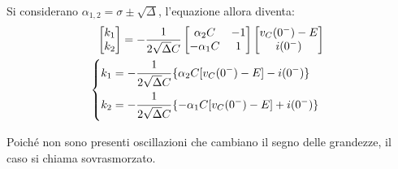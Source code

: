 \documentclass{article}
\numberwithin{equation}{subsection}
\begin{document}
Si considerano $\alpha_{1,2}=\sigma\pm\sqrt\Delta$, l'equazione allora diventa:
\begin{gather*}
    \begin{bmatrix}
        k_1\\k_2
    \end{bmatrix}=\displaystyle-\frac{1}{2\sqrt{\Delta} C}\begin{bmatrix}
        \alpha_2C&-1\\-\alpha_1C&1
    \end{bmatrix}\begin{bmatrix}
        v_C(0^-)-E\\i(0^-)
    \end{bmatrix}\\
    \begin{cases}
        k_1=\displaystyle-\frac{\strut 1}{\strut 2\sqrt{\Delta} C}\{\alpha_2C[v_C(0^-)-E]-i(0^-)\}\\
        k_2=\displaystyle-\frac{\strut 1}{\strut 2\sqrt{\Delta} C}\{-\alpha_1C[v_C(0^-)-E]+i(0^-)\}
    \end{cases}
\end{gather*}
 

Poiché non sono presenti oscillazioni che cambiano il segno delle grandezze, il caso si chiama sovrasmorzato. 
\end{document}
